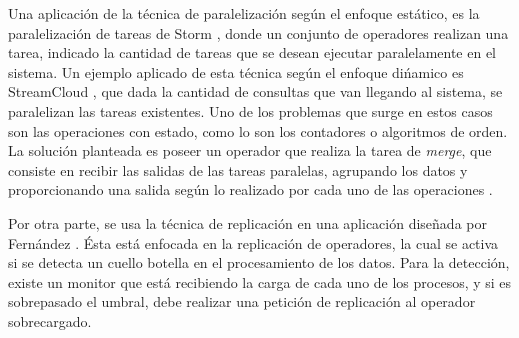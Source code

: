 Una aplicación de la técnica de paralelización según el enfoque estático, es la paralelización de tareas de Storm \citep{stormtwitterdoc}, donde un conjunto de operadores realizan una tarea, indicado la cantidad de tareas que se desean ejecutar paralelamente en el sistema. Un ejemplo aplicado de esta técnica según el enfoque dińamico es StreamCloud \citep{GulisanoJPSV12}, que dada la cantidad de consultas que van llegando al sistema, se paralelizan las tareas existentes. Uno de los problemas que surge en estos casos son las operaciones con estado, como lo son los contadores o algoritmos de orden. La solución planteada es poseer un operador que realiza la tarea de \textit{merge}, que consiste en recibir las salidas de las tareas paralelas, agrupando los datos y proporcionando una salida según lo realizado por cada uno de las operaciones \citep{GedikSHW14}.

Por otra parte, se usa la técnica de replicación en una aplicación diseñada por Fernández \citep{FernandezMKP13}. Ésta está enfocada en la replicación de operadores, la cual se activa si se detecta un cuello botella en el procesamiento de los datos. Para la detección, existe un monitor que está recibiendo la carga de cada uno de los procesos, y si es sobrepasado el umbral, debe realizar una petición de replicación al operador sobrecargado.
